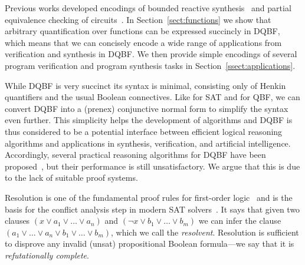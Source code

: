 \documentclass{svjour3}
\begin{document}
Previous works developed encodings of bounded reactive synthesis~\cite{FaymonvilleFinkbeinerRabeTentrup/2017/EncodingsOfBoundedSynthesis} and partial equivalence checking of circuits~\cite{GitinaReimerSauerWimmerSchollBecker/2012/PECusingDQBF}.
In Section~\ref{sect:functions} we show that arbitrary quantification over functions can be expressed succincly in DQBF, which means that we can concisely encode a wide range of applications from verification and synthesis in DQBF.
We then provide simple encodings of several program verification and program synthesis tasks in Section~\ref{ssect:applications}.

While DQBF is very succinct its syntax is minimal, consisting only of Henkin quantifiers and the usual Boolean connectives.
Like for SAT and for QBF, we can convert DQBF into a (prenex) conjunctive normal form to simplify the syntax even further.
This simplicity helps the development of algorithms and DQBF is thus considered to be a potential interface between efficient logical reasoning algorithms and applications in synthesis, verification, and artificial intelligence. %
Accordingly, several practical reasoning algorithms for DQBF have been proposed~\cite{FrohlichEtAl/2012/ADPLLAlgorithmForSolvingDQBF,GitinaReimerSauerWimmerSchollBecker/2012/PECusingDQBF,FinkbeinerT/2014/FastDQBFRefutation,frohlich2014idq,Gitina2015SolvingDT,WimmerReimerMarinBecker/2017/hqspre,TentrupRabe/2019/ClausalAbstractionForDQBF}, but their performance is still unsatisfactory.
We argue that this is due to the lack of suitable proof systems.

Resolution is one of the fundamental proof rules for first-order logic~\cite{DavisPutnam/1960/AComputingProcedureForQuantificationTheory} and is the basis for the conflict analysis step in modern SAT solvers~\cite{SilvaSakallah/1997/GRASPaNewSearchAlgorithmForSatisfiability}.
It says that given two clauses $(x\vee a_1\vee\dots\vee a_n)$ and $(\neg x\vee b_1\vee\dots\vee b_m)$ we can infer the clause $(a_1\vee\dots\vee a_n \vee b_1\vee\dots\vee b_m)$, which we call the \emph{resolvent}.
Resolution is sufficient to disprove any invalid (unsat) propositional Boolean formula---we say that it is \emph{refutationally complete}.
\end{document}
